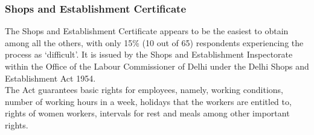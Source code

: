 \documentclass[a4paper, 12pt]{article}
\begin{document}
                   \subsubsection{Shops and Establishment Certificate}
                   The Shops and Establishment Certificate appears to be the easiest to obtain among all the others, with only 15\% (10 out of 65) respondents experiencing the process as ‘difficult’. It is issued by the Shops and Establishment Inspectorate within the Office of the Labour Commissioner of Delhi under the Delhi Shops and Establishment Act 1954.\\
                   The Act guarantees basic rights for employees, namely, working conditions, number of working hours in a week, holidays that the workers are entitled to, rights of women workers, intervals for rest and meals among other important rights.
         
         
\end{document}
